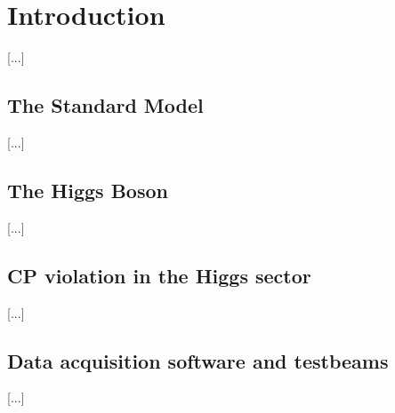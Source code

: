 \chapter{Introduction} 
\label{chapter:intro}


[...]

\section{The Standard Model}
[...]

\section{The Higgs Boson}
[...]

\section{CP violation in the Higgs sector}
[...]

\section{Data acquisition software and testbeams}
[...]